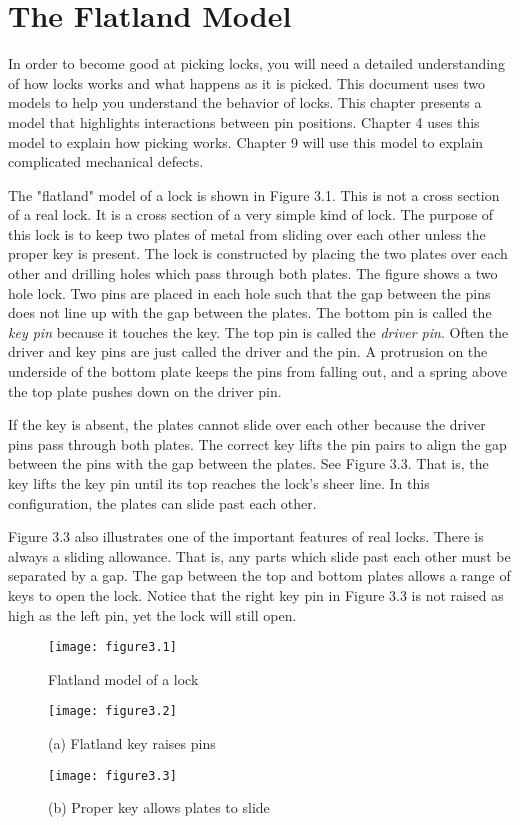 \chapter{The Flatland Model}
In order to become good at picking locks, you will need a detailed understanding of how locks works and what happens as it is picked.
This document uses two models to help you understand the behavior of locks.
This chapter presents a model that highlights interactions between pin positions.
Chapter 4 uses this model to explain how picking works.
Chapter 9 will use this model to explain complicated mechanical defects.

The "flatland" model of a lock is shown in Figure 3.1. This is not a cross section of a real lock.
It is a cross section of a very simple kind of lock.
The purpose of this lock is to keep two plates of metal from sliding over each other unless the proper key is present.
The lock is constructed by placing the two plates over each other and drilling holes which pass through both plates.
The figure shows a two hole lock. Two pins are placed in each hole such that the gap between the pins does not line up with the gap between the plates.
The bottom pin is called the \textit{key pin} because it touches the key.
The top pin is called the \textit{driver pin}. Often the driver and key pins are just called the driver and the pin.
A protrusion on the underside of the bottom plate keeps the pins from falling out, and a spring above the top plate pushes down on the driver pin.

If the key is absent, the plates cannot slide over each other because the driver pins pass through both plates.
The correct key lifts the pin pairs to align the gap between the pins with the gap between the plates.
See Figure 3.3. That is, the key lifts the key pin until its top reaches the lock's sheer line.
In this configuration, the plates can slide past each other.

Figure 3.3 also illustrates one of the important features of real locks.
There is always a sliding allowance.
That is, any parts which slide past each other must be separated by a gap.
The gap between the top and bottom plates allows a range of keys to open the lock.
Notice that the right key pin in Figure 3.3 is not raised as high as the left pin, yet the lock will still open.

\begin{figure}
    \texttt{[image: figure3.1]}
    \caption{Flatland model of a lock}
\end{figure}

\begin{figure}
    \texttt{[image: figure3.2]}
    \caption{(a) Flatland key raises pins}
\end{figure}

\begin{figure}
    \texttt{[image: figure3.3]}
    \caption{(b) Proper key allows plates to slide}
\end{figure}